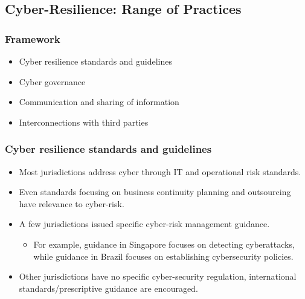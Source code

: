 
\subsection{ Cyber-Resilience: Range of Practices}


\subsubsection{Framework}
\begin{itemize}
\item Cyber resilience standards and guidelines
\item Cyber governance
\item Communication and sharing of information
\item Interconnections with third parties
\end{itemize}




\subsubsection{Cyber resilience standards and guidelines}
\begin{itemize}
\item Most jurisdictions address cyber through IT and operational risk standards.
\item Even standards focusing on business continuity planning and outsourcing have relevance to cyber-risk.
\item A few jurisdictions issued specific cyber-risk management guidance.
    \begin{itemize}
    \item For example, guidance in Singapore focuses on detecting cyberattacks, while guidance in Brazil focuses on establishing cybersecurity policies.
    \end{itemize}
\item Other jurisdictions have no specific cyber-security regulation, international standards/prescriptive guidance are encouraged.


\end{itemize}




